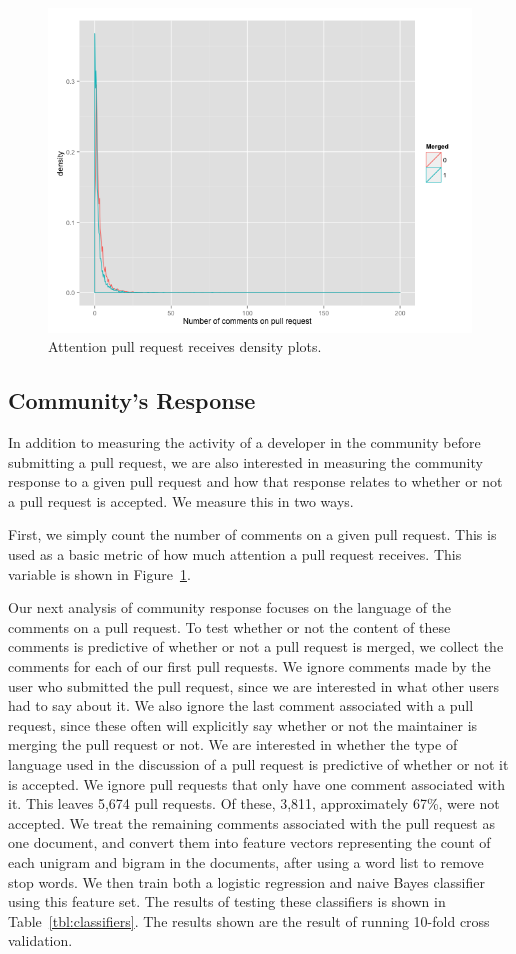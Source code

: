 \documentclass{sigchi}
\begin{document}
\begin{figure}[p] \centering
\includegraphics[width=0.9\columnwidth]{figures/comments_on_pr_density_ggplot.png}
\caption{Attention pull request receives density plots.} \label{fig:aprr}
\end{figure}

\subsection{Community's Response} In addition to measuring the activity of a
developer in the community before submitting a pull request, we are also
interested in measuring the community response to a given pull request and how
that response relates to whether or not a pull request is accepted. We measure
this in two ways.

First, we simply count the number of comments on a given pull request. This is
used as a basic metric of how much attention a pull request receives. This
variable is shown in Figure~\ref{fig:aprr}.

Our next analysis of community response focuses on the language of the comments
on a pull request. To test whether or not the content of these comments is
predictive of whether or not a pull request is merged, we collect the comments
for each of our first pull requests. We ignore comments made by the user who
submitted the pull request, since we are interested in what other users had to
say about it. We also ignore the last comment associated with a pull request,
since these often will explicitly say whether or not the maintainer is merging
the pull request or not. We are interested in whether the type of language used
in the discussion of a pull request is predictive of whether or not it is
accepted. We ignore pull requests that only have one comment associated with it.
This leaves 5,674 pull requests. Of these, 3,811, approximately 67\%, were not
accepted. We treat the remaining comments associated with the pull request as
one document, and convert them into feature vectors representing the count of
each unigram and bigram in the documents, after using a word list to remove stop
words. We then train both a logistic regression and naive Bayes classifier using
this feature set. The results of testing these classifiers is shown in
Table~\ref{tbl:classifiers}. The results shown are the result of running 10-fold
cross validation.
\end{document}

